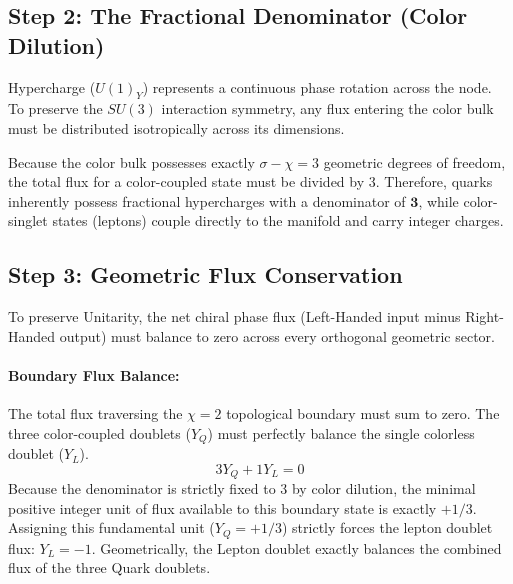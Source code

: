 \subsection{Step 2: The Fractional Denominator (Color Dilution)}
Hypercharge ($U(1)_Y$) represents a continuous phase rotation across the node. To preserve the $SU(3)$ interaction symmetry, any flux entering the color bulk must be distributed isotropically across its dimensions. 

Because the color bulk possesses exactly $\sigma-\chi=3$ geometric degrees of freedom, the total flux for a color-coupled state must be divided by 3. Therefore, quarks inherently possess fractional hypercharges with a denominator of $\mathbf{3}$, while color-singlet states (leptons) couple directly to the manifold and carry integer charges.

\subsection{Step 3: Geometric Flux Conservation}
To preserve Unitarity, the net chiral phase flux (Left-Handed input minus Right-Handed output) must balance to zero across every orthogonal geometric sector.

\paragraph{Boundary Flux Balance:}
The total flux traversing the $\chi=2$ topological boundary must sum to zero. The three color-coupled doublets ($Y_{Q}$) must perfectly balance the single colorless doublet ($Y_L$).
\begin{equation}
3 Y_Q + 1 Y_L = 0
\end{equation}
Because the denominator is strictly fixed to 3 by color dilution, the minimal positive integer unit of flux available to this boundary state is exactly $+1/3$. Assigning this fundamental unit ($Y_Q = +1/3$) strictly forces the lepton doublet flux: $Y_L = -1$. Geometrically, the Lepton doublet exactly balances the combined flux of the three Quark doublets.

